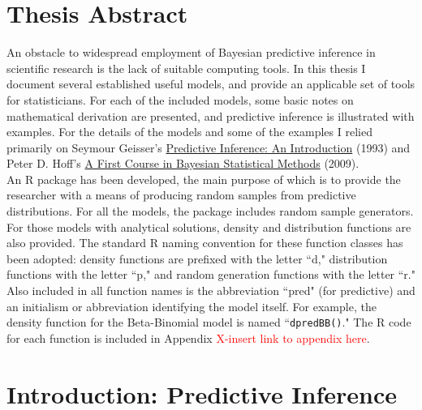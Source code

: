 \documentclass[12pt, a4paper]{article}
\begin{document}




\tableofcontents
\newpage


\section{Thesis Abstract}

An obstacle to widespread employment of Bayesian predictive inference in scientific research is the lack of suitable computing tools.  In this thesis I document several established useful models, and provide an applicable set of tools for statisticians.  For each of the included models, some basic notes on mathematical derivation are presented, and predictive inference is illustrated with examples.  For the details of the models and some of the examples I relied primarily on Seymour Geisser's \underline{Predictive Inference:  An Introduction} (1993) and Peter D. Hoff's \underline{A First Course in Bayesian Statistical Methods} (2009).\\

\noindent An R package has been developed, the main purpose of which is to provide the researcher with a means of producing random samples from predictive distributions.  For all the models, the package includes random sample generators.  For those models with analytical solutions, density and distribution functions are also provided.  The standard R naming convention for these function classes has been adopted:  density functions are prefixed with the letter ``d," distribution functions with the letter ``p," and random generation functions with the letter ``r."  Also included in all function names is the abbreviation ``pred" (for predictive) and an initialism or abbreviation identifying the model itself.  For example, the density function for the Beta-Binomial model is named ``\texttt{dpredBB()}."  The R code for each function is included in Appendix \textcolor{red}{X-insert link to appendix here}.




\section{Introduction:  Predictive Inference}
\end{document}

